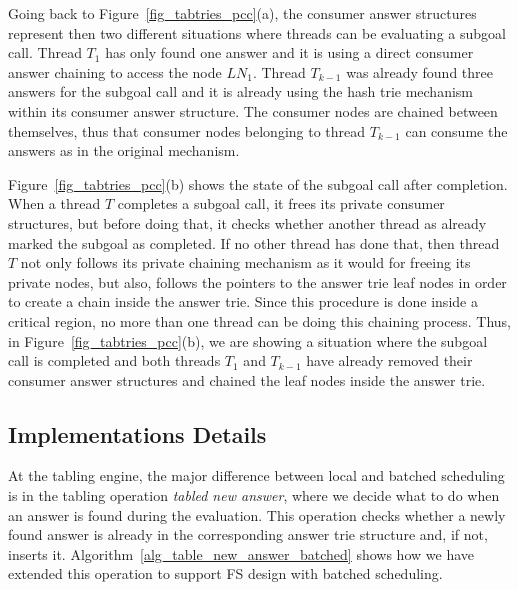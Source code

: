\documentclass{llncs}
\begin{document}

Going back to Figure~\ref{fig_tabtries_pcc}(a), the consumer answer
structures represent then two different situations where threads can
be evaluating a subgoal call. Thread $T_1$ has only found one answer
and it is using a direct consumer answer chaining to access the node
$LN_1$. Thread $T_{k-1}$ was already found three answers for the
subgoal call and it is already using the hash trie mechanism within
its consumer answer structure. The consumer nodes are chained between
themselves, thus that consumer nodes belonging to thread $T_{k-1}$ can
consume the answers as in the original mechanism.

Figure~\ref{fig_tabtries_pcc}(b) shows the state of the subgoal call
after completion. When a thread $T$ completes a subgoal call, it frees
its private consumer structures, but before doing that, it checks
whether another thread as already marked the subgoal as completed. If
no other thread has done that, then thread $T$ not only follows its
private chaining mechanism as it would for freeing its private nodes,
but also, follows the pointers to the answer trie leaf nodes in order
to create a chain inside the answer trie. Since this procedure is done
inside a critical region, no more than one thread can be doing this
chaining process. Thus, in Figure~\ref{fig_tabtries_pcc}(b), we are
showing a situation where the subgoal call is completed and both
threads $T_1$ and $T_{k-1}$ have already removed their consumer answer
structures and chained the leaf nodes inside the answer trie.

\subsection{Implementations Details}

At the tabling engine, the major difference between local and batched
scheduling is in the tabling operation \emph{tabled new answer}, where
we decide what to do when an answer is found during the
evaluation. This operation checks whether a newly found answer is
already in the corresponding answer trie structure and, if not,
inserts it. Algorithm~\ref{alg_table_new_answer_batched} shows how we
have extended this operation to support FS design with batched
scheduling.
\end{document}

